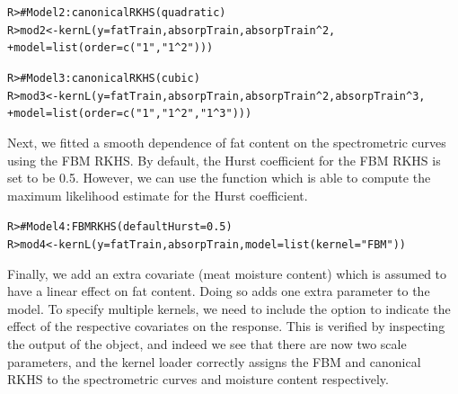 \documentclass[a4paper,showframe,11pt]{report}\usepackage[]{graphicx}\usepackage[]{color}
\makeatletter
\newcommand{\hlnum}[1]{\textcolor[rgb]{0.063,0.58,0.627}{#1}}%
\newcommand{\hlstr}[1]{\textcolor[rgb]{0.063,0.58,0.627}{#1}}%
\newcommand{\hlcom}[1]{\textcolor[rgb]{0.588,0.588,0.588}{#1}}%
\newcommand{\hlopt}[1]{\textcolor[rgb]{0.196,0.196,0.196}{#1}}%
\newcommand{\hlstd}[1]{\textcolor[rgb]{0.196,0.196,0.196}{#1}}%
\newcommand{\hlkwb}[1]{\textcolor[rgb]{0.627,0,0.314}{#1}}%
\newcommand{\hlkwc}[1]{\textcolor[rgb]{0,0.631,0.314}{#1}}%
\newcommand{\hlkwd}[1]{\textcolor[rgb]{0.78,0.227,0.412}{#1}}%
\newenvironment{kframe}{%
 \def\at@end@of@kframe{}%
 \ifinner\ifhmode%
  \def\at@end@of@kframe{\end{minipage}}%
  \begin{minipage}{\columnwidth}%
 \fi\fi%
 \def\FrameCommand##1{\hskip\@totalleftmargin \hskip-\fboxsep
 \colorbox{shadecolor}{##1}\hskip-\fboxsep
     \hskip-\linewidth \hskip-\@totalleftmargin \hskip\columnwidth}%
 \MakeFramed {\advance\hsize-\width
   \@totalleftmargin\z@ \linewidth\hsize
   \@setminipage}}%
 {\par\unskip\endMakeFramed%
 \at@end@of@kframe}
\newenvironment{knitrout}{}{} %
\makeatother
\begin{document}
\begin{knitrout}
\color{fgcolor}\begin{kframe}
\begin{alltt}
\hlstd{R> }\hlcom{# Model 2: canonical RKHS (quadratic)}
\hlstd{R> }\hlstd{mod2} \hlkwb{<-} \hlkwd{kernL}\hlstd{(}\hlkwc{y} \hlstd{= fatTrain, absorpTrain, absorpTrain} \hlopt{^} \hlnum{2}\hlstd{,}
\hlstd{+  }              \hlkwc{model} \hlstd{=} \hlkwd{list}\hlstd{(}\hlkwc{order} \hlstd{=} \hlkwd{c}\hlstd{(}\hlstr{"1"}\hlstd{,} \hlstr{"1^2"}\hlstd{)))}
\end{alltt}
\end{kframe}
\end{knitrout}
\begin{knitrout}
\color{fgcolor}\begin{kframe}
\begin{alltt}
\hlstd{R> }\hlcom{# Model 3: canonical RKHS (cubic)}
\hlstd{R> }\hlstd{mod3} \hlkwb{<-} \hlkwd{kernL}\hlstd{(}\hlkwc{y} \hlstd{= fatTrain, absorpTrain, absorpTrain} \hlopt{^} \hlnum{2}\hlstd{, absorpTrain} \hlopt{^} \hlnum{3}\hlstd{,}
\hlstd{+  }              \hlkwc{model} \hlstd{=} \hlkwd{list}\hlstd{(}\hlkwc{order} \hlstd{=} \hlkwd{c}\hlstd{(}\hlstr{"1"}\hlstd{,} \hlstr{"1^2"}\hlstd{,} \hlstr{"1^3"}\hlstd{)))}
\end{alltt}
\end{kframe}
\end{knitrout}

Next, we fitted a smooth dependence of fat content on the spectrometric curves using the FBM RKHS. By default, the Hurst coefficient for the FBM RKHS is set to be 0.5. However, we can use the function  which is able to compute the maximum likelihood estimate for the Hurst coefficient.

\begin{knitrout}
\color{fgcolor}\begin{kframe}
\begin{alltt}
\hlstd{R> }\hlcom{# Model 4: FBM RKHS (default Hurst = 0.5)}
\hlstd{R> }\hlstd{mod4} \hlkwb{<-} \hlkwd{kernL}\hlstd{(}\hlkwc{y} \hlstd{= fatTrain, absorpTrain,} \hlkwc{model} \hlstd{=} \hlkwd{list}\hlstd{(}\hlkwc{kernel} \hlstd{=} \hlstr{"FBM"}\hlstd{))}
\end{alltt}
\end{kframe}
\end{knitrout}

Finally, we add an extra covariate (meat moisture content) which is assumed to have a linear effect on fat content. Doing so adds one extra parameter to the model. To specify multiple kernels, we need to include the  option  to indicate the effect of the respective covariates on the response. This is verified by inspecting the  output of the  object, and indeed we see that there are now two scale parameters, and the kernel loader correctly assigns the FBM and canonical RKHS to the spectrometric curves and moisture content respectively.
\end{document}
